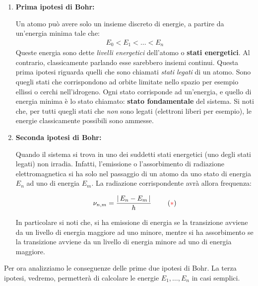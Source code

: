 \begin{enumerate}[label=\arabic*)]

	\item \textbf{Prima ipotesi di Bohr:}
		
		Un atomo può avere solo un insieme discreto di energie, a partire da un'energia minima tale che:
	\begin{align*}
		E_0 < E_1 < \dots < E_n
	\end{align*}
		Queste energia sono dette \textit{livelli energetici} dell'atomo o \textbf{stati energetici}. Al contrario, classicamente parlando esse sarebbero insiemi continui. Questa prima ipotesi riguarda quelli che sono chiamati \textit{stati legati} di un atomo. Sono quegli stati che corrispondono ad orbite limitate nello spazio per esempio ellissi o cerchi nell'idrogeno. Ogni stato corrisponde ad un'energia, e quello di energia minima è lo stato chiamato: \textbf{stato fondamentale} del sistema. Si noti che, per tutti quegli stati che \textit{non} sono legati (elettroni liberi per esempio), le energie classicamente possibili sono ammesse.
		
	\item \textbf{Seconda ipotesi di Bohr:}
	
		Quando il sistema si trova in uno dei suddetti stati energetici (uno degli stati legati) non irradia. Infatti, l'emissione o l'assorbimento di radiazione elettromagnetica si ha solo nel passaggio di un atomo da uno stato di energia $E_n$ ad uno di energia $E_m$. La radiazione corrispondente avrà allora frequenza:
		
	\begin{nb}
	\begin{align*}
		\nu_{n,m} = \frac{\abs{\, E_n - E_m \,}}{h} \,\,\qquad (\textcolor{red}{*})
	\end{align*}
	\end{nb}
	
		In particolare si noti che, si ha emissione di energia se la transizione avviene da un livello di energia maggiore ad uno minore, mentre si ha assorbimento se la transizione avviene da un livello di energia minore ad uno di energia maggiore.
\end{enumerate}
	
	Per ora analizziamo le conseguenze delle prime due ipotesi di Bohr. La terza ipotesi, vedremo, permetterà di calcolare le energie $E_1, \dots, E_n$ in casi semplici.

